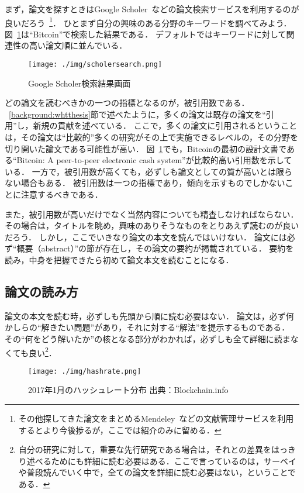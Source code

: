 まず，論文を探すときはGoogle Scholer~\cite{googlescholer}などの論文検索サービスを利用するのが良いだろう~\footnote{その他探してきた論文をまとめるMendeley~\cite{mendeley}などの文献管理サービスを利用するとより今後捗るが，ここでは紹介のみに留める．}．
ひとまず自分の興味のある分野のキーワードを調べてみよう．
図~\ref{img:scholersearch}は``Bitcoin''で検索した結果である．
デフォルトではキーワードに対して関連性の高い論文順に並んでいる．

\begin{figure}[htb]
    \begin{center}
        \texttt{[image: ./img/scholersearch.png]}
        \caption{Google Scholer検索結果画面}
        \label{img:scholersearch}
    \end{center}
\end{figure}

どの論文を読むべきかの一つの指標となるのが，被引用数である．
~\ref{background:whtthesis}節で述べたように，多くの論文は既存の論文を``引用''し，新規の貢献を述べている．
ここで，多くの論文に引用されるということは，その論文は``比較的''多くの研究がその上で実施できるレベルの，その分野を切り開いた論文である可能性が高い．
図~\ref{img:scholersearch}でも，Bitcoinの最初の設計文書である``Bitcoin: A peer-to-peer electronic cash system''が比較的高い引用数を示している．
一方で，被引用数が高くても，必ずしも論文としての質が高いとは限らない場合もある．
被引用数は一つの指標であり，傾向を示すものでしかないことに注意するべきである．

また，被引用数が高いだけでなく当然内容についても精査しなければならない．
その場合は，タイトルを眺め，興味のありそうなものをとりあえず読むのが良いだろう．
しかし，ここでいきなり論文の本文を読んではいけない．
論文には必ず``概要（abstract）''の節が存在し，その論文の要約が掲載されている．
要約を読み，中身を把握できたら初めて論文本文を読むことになる．

\subsection{論文の読み方}
\label{background:readpaper}
論文の本文を読む時，必ずしも先頭から順に読む必要はない．
論文は，必ず何かしらの``解きたい問題''があり，それに対する``解法''を提示するものである．
その``何をどう解いたか''の核となる部分がわかれば，必ずしも全て詳細に読まなくても良い\footnote{自分の研究に対して，重要な先行研究である場合は，それとの差異をはっきり述べるためにも詳細に読む必要はある．ここで言っているのは，サーベイや普段読んでいく中で，全ての論文を詳細に読む必要はない，ということである．}．





\begin{figure}[h]
    \begin{center}
        \texttt{[image: ./img/hashrate.png]}
        \caption{2017年1月のハッシュレート分布 出典：Blockchain.info\cite{bitcoinhashrate}}
        \label{img:hashrate}
    \end{center}
\end{figure}
\fi
